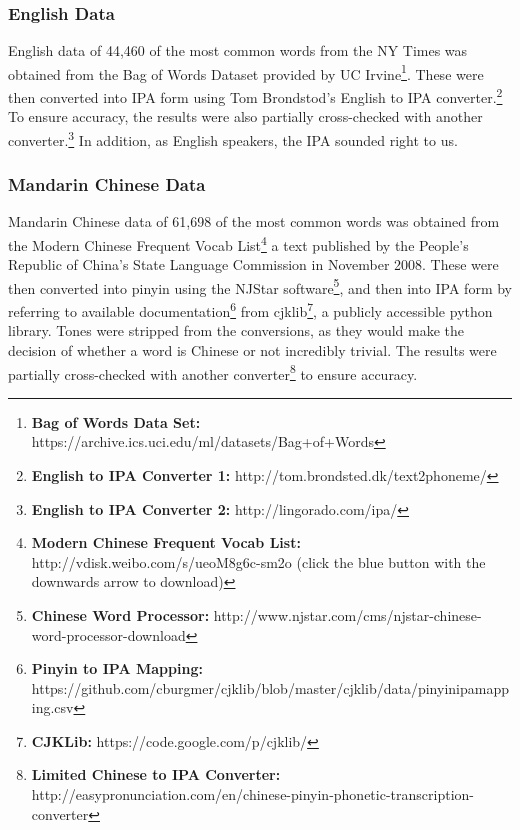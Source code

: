 \documentclass[a4paper]{article}
\begin{document}
\subsubsection{English Data}
English data of 44,460 of the most common words from the NY Times was obtained from the Bag of Words Dataset provided by UC Irvine\footnote{\textbf{Bag of Words Data Set:} https://archive.ics.uci.edu/ml/datasets/Bag+of+Words}. These were then converted into IPA form using Tom Brondstod's English to IPA converter.\footnote{\textbf{English to IPA Converter 1:} http://tom.brondsted.dk/text2phoneme/} To ensure accuracy, the results were also partially cross-checked with another converter.\footnote{\textbf{English to IPA Converter 2: }http://lingorado.com/ipa/} In addition, as English speakers, the IPA sounded right to us.

\subsubsection{Mandarin Chinese Data}
Mandarin Chinese data of 61,698 of the most common words was obtained from the Modern Chinese Frequent Vocab List\footnote{\textbf{Modern Chinese Frequent Vocab List: }http://vdisk.weibo.com/s/ueoM8g6c-sm2o (click the blue button with the downwards arrow to download)} a text published by the People's Republic of China's State Language Commission in November 2008. These were then converted into pinyin using the NJStar software\footnote{\textbf{Chinese Word Processor: }http://www.njstar.com/cms/njstar-chinese-word-processor-download}, and then into IPA form by referring to available documentation\footnote{\textbf{Pinyin to IPA Mapping:} https://github.com/cburgmer/cjklib/blob/master/cjklib/data/pinyinipamapping.csv} from cjklib\footnote{\textbf{CJKLib: }https://code.google.com/p/cjklib/}, a publicly accessible python library. Tones were stripped from the conversions, as they would make the decision of whether a word is Chinese or not incredibly trivial. The results were partially cross-checked with another converter\footnote{\textbf{Limited Chinese to IPA Converter: }http://easypronunciation.com/en/chinese-pinyin-phonetic-transcription-converter} to ensure accuracy.
\end{document}
